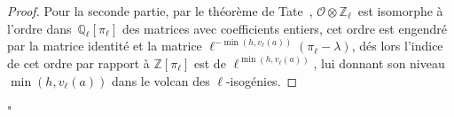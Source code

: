 \documentclass[10pt,a4paper]{article}
\theoremstyle{plain}
\theoremstyle{definition}
\theoremstyle{definition}
\theoremstyle{definition}
\theoremstyle{definition}
\theoremstyle{definition}
\theoremstyle{remark}
\theoremstyle{remark}
\theoremstyle{definition}
\begin{document}
{\begin{proof}
Pour la seconde partie, par le théorème de 
Tate~\cite[Isogeny theorem III.7.7 (a)]{Silv1}, $\mathcal{O} \otimes 
 \mathbb{Z}_{\ell}$~est isomorphe à l'ordre dans~$\mathbb{Q}_{\ell}[\pi_{\ell}]$
des matrices avec coefficients entiers, cet ordre est engendré par la matrice 
 identité et la matrice $\ell^{-\min (h, v_\ell(a))} (\pi_{\ell}-\lambda)$, dés 
 lors l'indice de cet ordre par rapport à $\mathbb{Z}[\pi_{\ell}]$ est de 
$\ell^{\min (h, v_\ell(a))}$, lui donnant son niveau $\min (h, v_\ell(a))$ dans 
 le volcan des $\ell$-isogénies.
\end{proof}
"}


\end{document}
